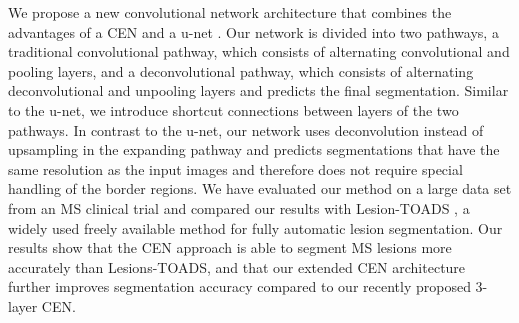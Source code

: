 % 


We propose a new convolutional network architecture that combines the advantages
of a CEN \cite{brosch2015} and a u-net \cite{ronneberger2015}. Our network is
divided into two pathways, a traditional convolutional pathway, which consists
of alternating convolutional and pooling layers, and a deconvolutional pathway,
which consists of alternating deconvolutional and unpooling layers and predicts
the final segmentation. Similar to the u-net, we introduce shortcut connections
between layers of the two pathways. In contrast to the u-net, our network uses
deconvolution instead of upsampling in the expanding pathway and predicts
segmentations that have the same resolution as the input images and therefore
does not require special handling of the border regions. We have evaluated our
method on a large data set from an MS clinical trial and compared our results
with Lesion-TOADS \cite{shiee2010topology}, a widely used freely available
method for fully automatic lesion segmentation. Our results show that the CEN
approach is able to segment MS lesions more accurately than Lesions-TOADS, and
that our extended CEN architecture further improves segmentation accuracy
compared to our recently proposed 3-layer CEN.


